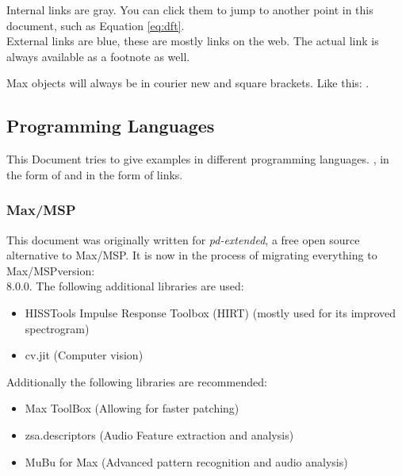 
Internal links are gray. You can click them to jump to another point in this document, such as Equation \ref{eq:dft}.\\

External links are blue, these are mostly links on the web. The actual link is always available as a footnote as well. 

Max objects will always be in courier new and square brackets. Like this: .\\


\subsection{Programming Languages}
This Document tries to give examples in different programming languages. ,  in the form of  and  in the form of  links.

\subsubsection*{Max/MSP}
This document was originally written for \textit{pd-extended}, a free open source alternative to Max/MSP. It is now in the process of migrating everything to Max/MSPversion:\\
8.0.0.
The following additional libraries are used:
\begin{itemize}
	\item HISSTools Impulse Response Toolbox (HIRT) (mostly used for its improved spectrogram)
	\item cv.jit (Computer vision)
\end{itemize}
Additionally the following libraries are recommended:
\begin{itemize}
	\item Max ToolBox (Allowing for faster patching)
	\item zsa.descriptors (Audio Feature extraction and analysis)
	\item MuBu for Max (Advanced pattern recognition and audio analysis)
\end{itemize}

